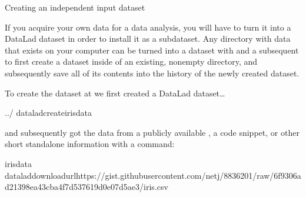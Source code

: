 \ignorespaces \begin{findoutmore}[label={fom-iris}, before title={\thetcbcounter\ }, float, floatplacement=tb, check odd page=true]{Creating an independent input dataset}
\label{\detokenize{basics/101-130-yodaproject:fom-iris}}

\sphinxAtStartPar
If you acquire your own data for a data analysis, you will have
to turn it into a DataLad dataset in order to install it as a subdataset.
Any directory with data that exists on
your computer can be turned into a dataset with 
and a subsequent  to first create a dataset inside of
an existing, non\sphinxhyphen{}empty directory, and subsequently save all of its contents into
the history of the newly created dataset.

\sphinxAtStartPar
To create the  dataset at 
we first created a DataLad dataset…

\begin{sphinxVerbatim}[commandchars=\\\{\}]
../
dataladcreateiris\PYGZus{}data
\end{sphinxVerbatim}

\sphinxAtStartPar
and subsequently got the data from a publicly available
, a code snippet, or other short standalone information with a
 command:

\begin{sphinxVerbatim}[commandchars=\\\{\}]
iris\PYGZus{}data
dataladdownload\PYGZhy{}urlhttps://gist.githubusercontent.com/netj/8836201/raw/6f9306ad21398ea43cba4f7d537619d0e07d5ae3/iris.csv
\end{sphinxVerbatim}


\end{findoutmore}
